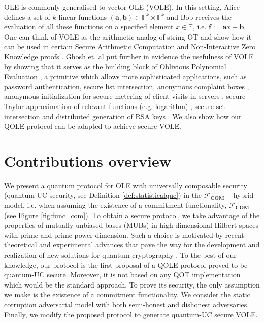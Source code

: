 OLE is commonly generalised to vector OLE (VOLE). In this setting, Alice defines a set of $k$ linear functions $(\bm{a}, \bm{b})\in\mathbb{F}^k\times\mathbb{F}^k$ and Bob receives the evaluation of all these functions on a specified element $x\in\mathbb{F}$, i.e. $\bm{f}:=\bm{a} x+ \bm{b}$. One can think of VOLE as the arithmetic analog of string OT and show how it can be used  in certain Secure Arithmetic Computation and Non-Interactive Zero Knowledge proofs \cite{BCGI18}. Ghosh et. al  put further in evidence the usefulness of VOLE by showing that it serves as the building block of Oblivious Polynomial Evaluation \cite{GNN17}, a primitive which allows more sophisticated applications, such as password authentication, secure  list intersection,  anonymous complaint boxes \cite{NP06}, anonymous initialization for secure metering of client visits in servers \cite{NP99},  secure Taylor approximation of relevant functions (e.g. logarithm) \cite{LP02}, secure set intersection \cite{H18} and distributed generation of RSA keys \cite{G99}.  We also show how our QOLE protocol can be adapted to achieve secure VOLE.

\section{Contributions overview}\label{Intro_contributions}

We present a quantum protocol for OLE with universally composable security (quantum-UC security, see Definition \ref{def:statisticalquc}) in the $\mathcal{F}_{\textbf{COM}}-$hybrid model, i.e. when assuming the existence of a commitment functionality, $\mathcal{F}_{\textbf{COM}}$ (see Figure \ref{fig:func_com}). To obtain a secure protocol, we take advantage of the properties of mutually unbiased bases (MUBs) in high-dimensional Hilbert spaces with prime and prime-power dimension. Such a choice is motivated by recent theoretical and experimental advances that pave the way for the development and realization of new solutions for quantum cryptography \cite{BPT00, CBKG02, AGS03, AKBH07, SS10, DEBZ10, Zhongetal2015, Sitetal17, Bouchardetal18, BHVBFHM18, DHMPPV21}. To the best of our knowledge, our protocol is the first proposal of a QOLE protocol proved to be quantum-UC secure. Moreover, it is not based on any QOT implementation which would be the standard approach. To prove its security, the only assumption we make is the existence of a commitment functionality. We consider the static corruption adversarial model with both semi-honest and dishonest adversaries. Finally, we modify the proposed protocol to generate quantum-UC secure VOLE.


